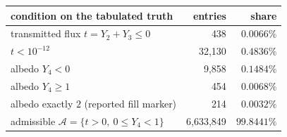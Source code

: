 \begin{tabular}{lrr}
\toprule
condition on the tabulated truth & entries & share \\
\midrule
transmitted flux $t=Y_2+Y_3 \le 0$ & 438 & $0.0066\%$ \\
$t < 10^{-12}$ & 32,130 & $0.4836\%$ \\
albedo $Y_4 < 0$ & 9,858 & $0.1484\%$ \\
albedo $Y_4 \ge 1$ & 454 & $0.0068\%$ \\
albedo exactly $2$ (reported fill marker) & 214 & $0.0032\%$ \\
\midrule
admissible $\mathcal{A}=\{t>0,\ 0\le Y_4<1\}$ & 6,633,849 & $99.8441\%$ \\
\bottomrule
\end{tabular}
